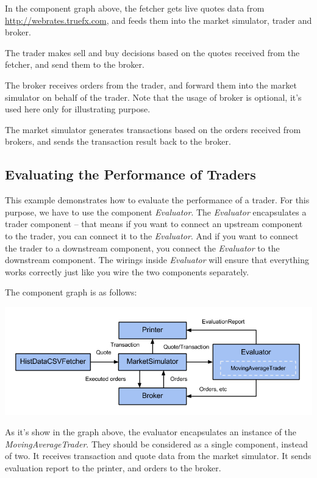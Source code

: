 In the component graph above, the fetcher gets live quotes data from \url{http://webrates.truefx.com}, and feeds them into the market simulator, trader and broker.

The trader makes sell and buy decisions based on the quotes received from the fetcher, and send them to the broker.

The broker receives orders from the trader, and forward them into the market simulator on behalf of the trader. Note that the usage of broker is optional, it's used here only for illustrating purpose.

The market simulator generates transactions based on the orders received from brokers, and sends the transaction result back to the broker.


\subsection{Evaluating the Performance of Traders}

This example demonstrates how to evaluate the performance of a trader. For this purpose, we have to use the component \emph{Evaluator}. The \emph{Evaluator} encapsulates a trader component -- that means if you want to connect an upstream component to the trader, you can connect it to the \emph{Evaluator}. And if you want to connect the trader to a downstream component, you connect the \emph{Evaluator} to the downstream component. The wirings inside \emph{Evaluator} will ensure that everything works correctly just like you wire the two components separately.

The component graph is as follows:

\noindent
\includegraphics[width=\textwidth]{img/examples/evaluation}

As it's show in the graph above, the evaluator encapsulates an instance of the \emph{MovingAverageTrader}. They should be considered as a single component, instead of two. It receives transaction and quote data from the market simulator. It sends evaluation report to the printer, and orders to the broker.

